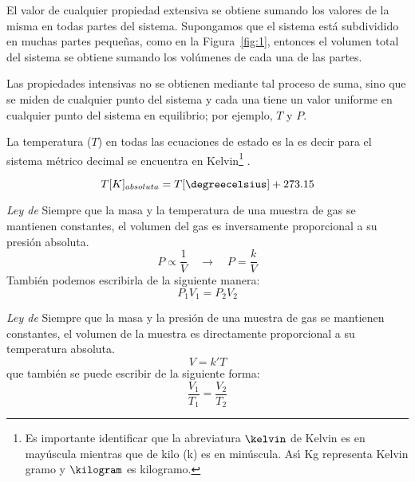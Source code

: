El valor de cualquier propiedad extensiva se obtiene sumando
los va\-lores de la misma en todas partes del sistema. Supongamos que el sistema est\'a
subdividido en muchas partes peque\~nas, como en la Figura~\ref{fig:1}, entonces el volumen total del sistema se obtiene sumando los vol\'umenes de
cada una de las partes.

Las propiedades intensivas no se obtienen mediante tal
proceso de su\-ma, sino que se miden de cualquier punto del sistema y cada una tiene un valor
uniforme en cualquier punto del sistema en equilibrio; por ejemplo, $T$ y $P$.

La temperatura ($T$) en todas las ecuaciones de estado es la   es decir para el sistema m\'etrico decimal se encuentra en Kelvin\footnote{ Es importante identificar que la abreviatura $\kelvin$ de Kelvin es en may\'uscula mientras que de kilo (k) es en min\'uscula. As\'{\i} Kg representa Kelvin gramo y $\kilogram$ es kilogramo.} .

\begin{equation}
T[K]_{absoluta} = T[\degreecelsius] + 273.15
\end{equation}

\textit{Ley de }  Siempre que la masa
y la temperatura de una muestra de gas se mantienen constantes, el volumen del gas es
inversamente proporcional a su presi\'on absoluta.
\begin{equation}
P \propto \frac{1}{V} \quad{ \longrightarrow }\quad  P = \frac{k}{V}
\end{equation}
Tambi\'en podemos escribirla de la siguiente manera:
\begin{equation}
P_1 V_1 = P_2 V_2
\end{equation}

\textit{Ley de } Siempre que la masa y la presi\'on de una muestra de gas se mantienen constantes, el volumen de la muestra es directamente proporcional a su temperatura absoluta.
\begin{equation}
V= k'T
\end{equation}
que tambi\'en se puede escribir de la siguiente forma:
\begin{equation}
\frac{V_1}{T_1} = \frac{V_2}{T_2}
\end{equation}

